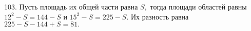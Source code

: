 103. Пусть площадь их общей части равна $S,$ тогда площади областей равны $12^2-S=144-S$ и $15^2-S=225-S.$ Их разность равна $225-S-144+S=81.$\\
